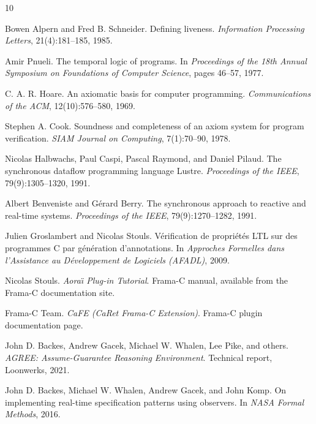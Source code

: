 \documentclass[11pt,a4paper]{article}
\begin{document}
\begin{thebibliography}{10}

Bowen Alpern and Fred B. Schneider.
\newblock Defining liveness.
\newblock \emph{Information Processing Letters}, 21(4):181--185, 1985.

Amir Pnueli.
\newblock The temporal logic of programs.
\newblock In \emph{Proceedings of the 18th Annual Symposium on Foundations of
  Computer Science}, pages 46--57, 1977.

C. A. R. Hoare.
\newblock An axiomatic basis for computer programming.
\newblock \emph{Communications of the ACM}, 12(10):576--580, 1969.

Stephen A. Cook.
\newblock Soundness and completeness of an axiom system for program
  verification.
\newblock \emph{SIAM Journal on Computing}, 7(1):70--90, 1978.

Nicolas Halbwachs, Paul Caspi, Pascal Raymond, and Daniel Pilaud.
\newblock The synchronous dataflow programming language Lustre.
\newblock \emph{Proceedings of the IEEE}, 79(9):1305--1320, 1991.

Albert Benveniste and G\'erard Berry.
\newblock The synchronous approach to reactive and real-time systems.
\newblock \emph{Proceedings of the IEEE}, 79(9):1270--1282, 1991.

Julien Groslambert and Nicolas Stouls.
\newblock V\'erification de propri\'et\'es LTL sur des programmes C par
  g\'en\'eration d'annotations.
\newblock In \emph{Approches Formelles dans l'Assistance au D\'eveloppement de
  Logiciels (AFADL)}, 2009.

Nicolas Stouls.
\newblock \emph{Aora\"\i{} Plug-in Tutorial}.
\newblock Frama-C manual, available from the Frama-C documentation site.

Frama-C Team.
\newblock \emph{CaFE (CaRet Frama-C Extension)}.
\newblock Frama-C plugin documentation page.

John D. Backes, Andrew Gacek, Michael W. Whalen, Lee Pike, and others.
\newblock \emph{AGREE: Assume-Guarantee Reasoning Environment}.
\newblock Technical report, Loonwerks, 2021.

John D. Backes, Michael W. Whalen, Andrew Gacek, and John Komp.
\newblock On implementing real-time specification patterns using observers.
\newblock In \emph{NASA Formal Methods}, 2016.


\end{thebibliography}
\end{document}
